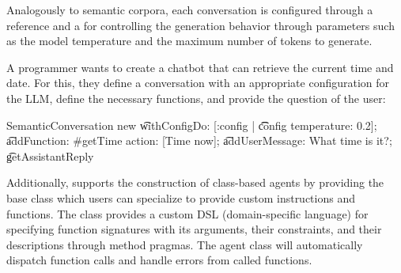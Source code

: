 Analogously to semantic corpora, each conversation is configured through a  reference and a  for controlling the generation behavior through parameters such as the model temperature and the maximum number of tokens to generate.

\begin{example}
	A programmer wants to create a chatbot that can retrieve the current time and date.
	For this, they define a conversation with an appropriate configuration for the LLM, define the necessary functions, and provide the question of the user:

	\begin{multicode}
		SemanticConversation new \n
		\t	withConfigDo: [:config | \n
		\t	\t	config temperature: 0.2]; \n
		\t	addFunction: \#getTime action: [Time now]; \n
		\t	addUserMessage: \textquotesingle What time is it?\textquotesingle; \n
		\t	getAssistantReply 
	\end{multicode}
\end{example}

Additionally, \semtex supports the construction of class-based agents by providing the base class  which users can specialize to provide custom instructions and functions.
The  class provides a custom DSL (domain-specific language) for specifying function signatures with its arguments, their constraints, and their descriptions through method pragmas.
The agent class will automatically dispatch function calls and handle errors from called functions.

